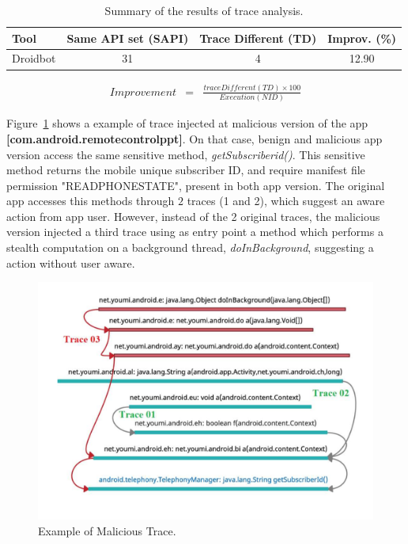 \begin{table}[ht!]
  \caption{Summary of the results of trace analysis. }
  \centering
  \begin{small}
 \begin{tabular}{lccc}
   \toprule
   Tool & Same API set (SAPI) & Trace Different (TD) & Improv. (\%) \\   \midrule
   Droidbot &  31 & 4 & 12.90 \\
 \bottomrule
 \end{tabular}
 \end{small}
 \label{tab:pa}
\end{table}



\begin{eqnarray}
Improvement & = & \frac{trace Different (TD) \times 100}{Execution (NID)} 
\label{improve}
\end{eqnarray}


Figure~\ref{fig:maliciousTrace} shows a example of trace injected at malicious version of the app \textbf{[com.android.remotecontrolppt]}. On that case, benign and malicious app version access the same sensitive method, \textit{getSubscriberid()}. This sensitive method returns the mobile unique subscriber ID, and require manifest file permission "READ\underline{\space}PHONE\underline{\space}STATE", present in both app version. The original app accesses this methods through $2$ traces (1 and 2), which suggest an aware action from app user. However, instead of the 2 original traces, the malicious version injected a third trace using as entry point a method which performs a stealth computation on a background thread, \textit{doInBackground}, suggesting a action without user aware.

\begin{figure}
\centering
\includegraphics[scale=0.30]{images/maliciousTrace_example01.pdf}
\caption{Example of Malicious Trace.}
 \label{fig:maliciousTrace}
\end{figure}

